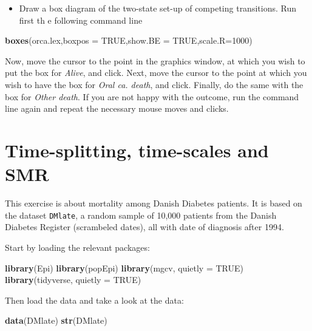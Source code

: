 \documentclass[
]{book}
\newenvironment{Shaded}{\begin{snugshade}}{\end{snugshade}}
\newcommand{\AttributeTok}[1]{\textcolor[rgb]{0.13,0.29,0.53}{#1}}
\newcommand{\ConstantTok}[1]{\textcolor[rgb]{0.56,0.35,0.01}{#1}}
\newcommand{\DecValTok}[1]{\textcolor[rgb]{0.00,0.00,0.81}{#1}}
\newcommand{\FunctionTok}[1]{\textcolor[rgb]{0.13,0.29,0.53}{\textbf{#1}}}
\newcommand{\NormalTok}[1]{#1}
\providecommand{\tightlist}{%
  \setlength{\itemsep}{0pt}\setlength{\parskip}{0pt}}
\begin{document}
\begin{itemize}
\tightlist
\item
  Draw a box diagram of the two-state set-up of competing transitions.
  Run first th e following command line
\end{itemize}

\begin{Shaded}
\begin{Highlighting}[]
\FunctionTok{boxes}\NormalTok{(orca.lex,}\AttributeTok{boxpos =} \ConstantTok{TRUE}\NormalTok{,}\AttributeTok{show.BE =} \ConstantTok{TRUE}\NormalTok{,}\AttributeTok{scale.R=}\DecValTok{1000}\NormalTok{)}
\end{Highlighting}
\end{Shaded}

Now, move the cursor to the point in the graphics window, at which you
wish to put the box for \emph{Alive}, and click. Next, move the cursor to the
point at which you wish to have the box for \emph{Oral ca. death}, and click.
Finally, do the same with the box for \emph{Other death}. If you are not
happy with the outcome, run the command line again and repeat the
necessary mouse moves and clicks.

\chapter{Time-splitting, time-scales and SMR}\label{time-splitting-time-scales-and-smr}

This exercise is about mortality among Danish Diabetes patients. It is
based on the dataset \texttt{DMlate}, a random sample of 10,000
patients from the Danish Diabetes Register (scrambeled dates), all
with date of diagnosis after 1994.

Start by loading the relevant packages:

\begin{Shaded}
\begin{Highlighting}[]
\FunctionTok{library}\NormalTok{(Epi)}
\FunctionTok{library}\NormalTok{(popEpi)}
\FunctionTok{library}\NormalTok{(mgcv, }\AttributeTok{quietly =} \ConstantTok{TRUE}\NormalTok{)}
\FunctionTok{library}\NormalTok{(tidyverse, }\AttributeTok{quietly =} \ConstantTok{TRUE}\NormalTok{)}
\end{Highlighting}
\end{Shaded}

Then load the data and take a look at the data:

\begin{Shaded}
\begin{Highlighting}[]
\FunctionTok{data}\NormalTok{(DMlate)}
\FunctionTok{str}\NormalTok{(DMlate)}
\end{Highlighting}
\end{Shaded}
\end{document}
